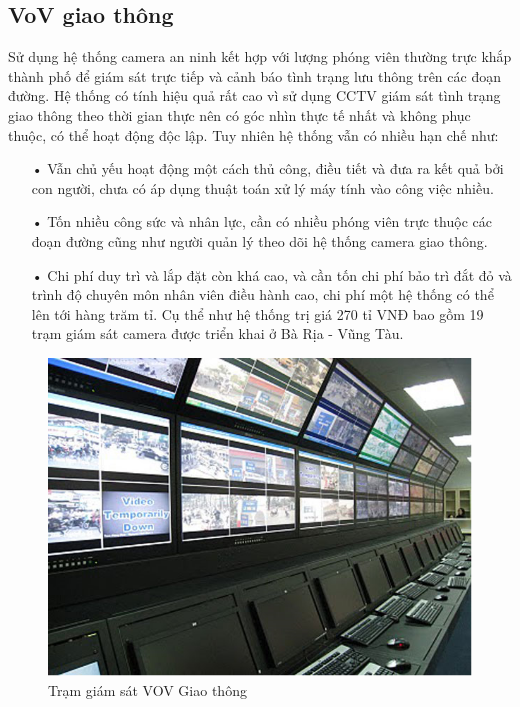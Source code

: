 \subsection{VoV giao thông}
Sử dụng hệ thống camera an ninh kết hợp với lượng phóng viên thường trực khắp thành phố để giám sát trực tiếp và cảnh báo tình trạng lưu thông trên các đoạn đường. Hệ thống có tính hiệu quả rất cao vì sử dụng CCTV giám sát tình trạng giao thông theo thời gian thực nên có góc nhìn thực tế nhất và không phục thuộc, có thể hoạt động độc lập. Tuy nhiên hệ thống vẫn có nhiều hạn chế như:
\begin{itemize}
	\item[•]Vẫn chủ yếu hoạt động một cách thủ công, điều tiết và đưa ra kết quả bởi con người, chưa có áp dụng thuật toán xử lý máy tính vào công việc nhiều.
	\item[•]Tốn nhiều công sức và nhân lực, cần có nhiều phóng viên trực thuộc các đoạn đường cũng như người quản lý theo dõi hệ thống camera giao thông.
	\item[•]Chi phí duy trì và lắp đặt còn khá cao, và cần tốn chi phí bảo trì đắt đỏ và trình độ chuyên môn nhân viên điều hành cao, chi phí một hệ thống có thể lên tới hàng trăm tỉ. Cụ thể như hệ thống trị giá 270 tỉ VNĐ bao gồm 19 trạm giám sát camera được triển khai ở Bà Rịa - Vũng Tàu.
\end{itemize}
\begin{figure}[H] 
	\centering    
	\includegraphics[width=1.0\textwidth]{pic1}
	\caption[Trạm giám sát VOV Giao thông ]{Trạm giám sát VOV Giao thông}
	\label{fig:pic1}
\end{figure}



